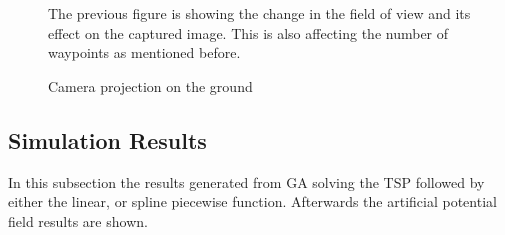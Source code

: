 \begin{figure}[H]
\centering
{}
The previous figure is showing the change in the field of view and its effect on the captured image. This is also affecting the number of waypoints as mentioned before.

\caption{Camera projection on the ground}
\label{fig:cam_proj_vrep}
\end{figure}

\subsection{Simulation Results}
In this subsection the results generated from GA solving the TSP followed by either the linear, or spline piecewise function. Afterwards the artificial potential field results are shown. 

